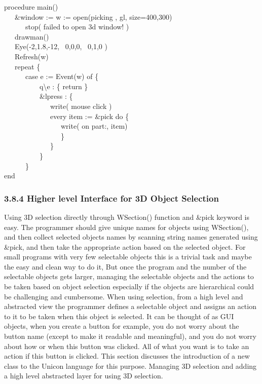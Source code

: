 \documentclass[letterpaper]{article}
\begin{document}
{\sffamily
procedure main() \\
\ \ \ \&window := w := open({\textquotedbl}picking{\textquotedbl} , {\textquotedbl}gl{\textquotedbl},
{\textquotedbl}size=400,300{\textquotedbl}) {\textbar} \\
\ \ \ \ \ \ stop({\textquotedbl} failed to open 3d window! {\textquotedbl})\\
\ \ \ drawman() \\
\ \ \ Eye(-2,1.8,-12, \ 0,0,0, \ 0,1,0 ) \\
\ \ \ Refresh(w) \\
\ \ \ repeat \{ \\
\ \ \ \ \ \ case e := Event(w) of \{ \\
\ \ \ \ \ \ \ \ \ \ {\textquotedbl}q{\textquotedbl}{\textbar}{\textquotedbl}{\textbackslash}e{\textquotedbl}
: \{ return \} \\
\ \ \ \ \ \ \ \ \ \ \&lpress : \{ \\
\ \ \ \ \ \ \ \ \ \ \ \ \ write({\textquotedbl} mouse click{\textquotedbl} ) \\
\ \ \ \ \ \ \ \ \ \ \ \ \ every item := \&pick do \{ \\
\ \ \ \ \ \ \ \ \ \ \ \ \ \ \ \ write( {\textquotedbl}on part:{\textquotedbl}, item) \\
\ \ \ \ \ \ \ \ \ \ \ \ \ \ \ \ \} \\
\ \ \ \ \ \ \ \ \ \ \ \ \ \} \\
\ \ \ \ \ \ \ \ \ \ \} \\
\ \ \ \ \ \ \} \\
end
}


\subsubsection[3.8.4 Higher level Interface for 3D Object Selection]{3.8.4 Higher level Interface for 3D Object Selection}

Using 3D selection directly through \textsf{WSection()} function and
\textsf{\&}\textsf{pick} keyword is easy. The programmer should give
unique names for objects using \textsf{WSection}\textsf{()}, and then
collect selected objects names by scanning string names generated
using \textsf{\&pick}, and then take the appropriate action based on
the selected object. For small programs with very few selectable
objects this is a trivial task and maybe the easy and clean way to do
it, But once the program and the number of the selectable objects gets
larger, managing the selectable objects and the actions to be taken
based on object selection especially if the objects are hierarchical
could be challenging and cumbersome. When using selection, from a high
level and abstracted view the programmer defines a selectable object
and assigns an action to it to be taken when this object is
selected. It can be thought of as GUI objects, when you create a
button for example, you do not worry about the button name (except to
make it readable and meaningful), and you do not worry about how or
when this button was clicked. All of what you want is to take an
action if this button is clicked. This section discusses the
introduction of a new class to the Unicon language for this
purpose. Managing 3D selection and adding a high level abstracted
layer for using 3D selection.
\end{document}

